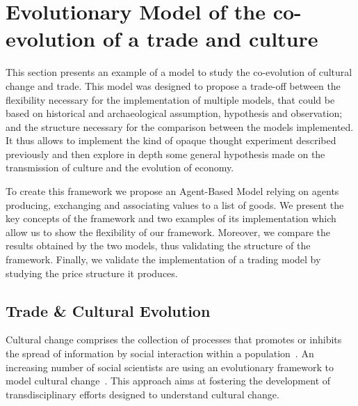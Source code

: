 \documentclass[a4paper]{article}
\begin{document}

\section{Evolutionary Model of the co-evolution of a trade and culture}

This section presents an example of a model to study the co-evolution of cultural change and trade. This model was designed to propose a trade-off between the flexibility necessary for the implementation of multiple models, that could be based on historical and archaeological assumption, hypothesis and observation; and the structure necessary for the comparison between the models implemented. It thus allows to implement the kind of opaque thought experiment described previously and then explore in depth some general hypothesis made on the transmission of culture and the evolution of economy. 

To create this framework we propose an Agent-Based Model relying on agents producing, exchanging and associating values to a list of goods. We present the key concepts of the framework and two examples of its implementation which allow us to show the flexibility of our framework. Moreover, we compare the results obtained by the two models, thus validating the structure of the framework. Finally, we validate the implementation of a trading model by studying the price structure it produces.


\subsection{Trade \& Cultural Evolution}\label{sec:tc:intro}


Cultural change comprises the collection of processes that promotes or inhibits the spread of information by social interaction within a population~\cite{boyd_origin_2005}. An increasing number of social scientists are using an evolutionary framework to model cultural change~\cite{henrich_evolution_2003}. This approach aims at fostering the development of transdisciplinary efforts designed to understand cultural change.
\end{document}
